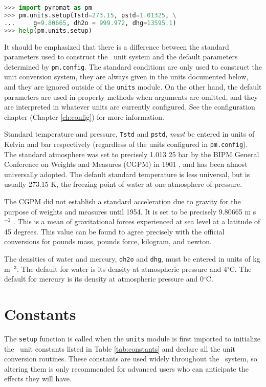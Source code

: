 \begin{lstlisting}[language=Python]
>>> import pyromat as pm
>>> pm.units.setup(Tstd=273.15, pstd=1.01325, \
...     g=9.80665, dh2o = 999.972, dhg=13595.1)
>>> help(pm.units.setup)
\end{lstlisting}

It should be emphasized that there is a difference between the standard parameters used to construct the \PM\ unit system and the default parameters determined by \verb|pm.config|.  The standard conditions are only used to construct the unit conversion system, they are always given in the units documented below, and they are ignored outside of the \verb|units| module.  On the other hand, the default parameters are used in property methods when arguments are omitted, and they are interpreted in whatever units are currently configured.  See the configuration chapter (Chapter \ref{ch:config}) for more information.

Standard temperature and pressure, \verb|Tstd| and \verb|pstd|, \emph{must} be entered in units of Kelvin and bar respectively (regardless of the units configured in \verb|pm.config|).  The standard atmosphere was set to precisely 1.013 25 bar by the BIPM General Conference on Weights and Measures (CGPM) in 1901 \cite{cgpm:3:2}, and has been almost universally adopted.  The default standard temperature is less universal, but is usually 273.15 K, the freezing point of water at one atmosphere of pressure.

The CGPM did not establish a standard acceleration due to gravity for the purpose of weights and measures until 1954.  It is set to be precisely 9.80665 m s$^{-2}$ \cite{cgpm:10:4}.  This is a mean of gravitational forces experienced at sea level at a latitude of 45 degrees.  This value can be found to agree precisely with the official conversions for pounds mass, pounds force, kilogram, and newton. 

The densities of water and mercury, \verb|dh2o| and \verb|dhg|, must be entered in units of kg m$^{-3}$.  The default for water is its density at atmospheric pressure and 4$^\circ$C.  The default for mercury is its density at atmospheric pressure and 0$^\circ$C.

\section{Constants}\label{sec:units:constants}

The \verb|setup| function is called when the \verb|units| module is first imported to initialize the \PM\ unit constants listed in Table \ref{tab:constants} and declare all the unit conversion routines.  These constants are used widely throughout the \PM\ system, so altering them is only recommended for advanced users who can anticipate the effects they will have.  

